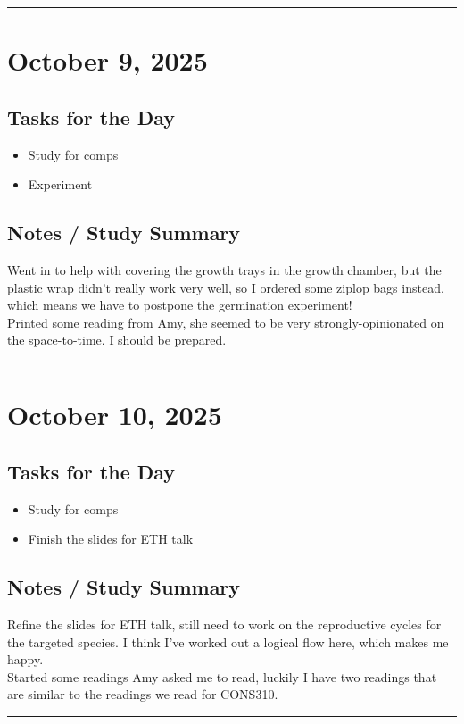 \documentclass[12pt]{article}
\begin{document}
\vspace{1em}
\hrule
\vspace{1em}

\section*{October 9, 2025}

\subsection*{Tasks for the Day}
\begin{itemize}
    \item Study for comps
    \item Experiment
\end{itemize}
\subsection*{Notes / Study Summary}
Went in to help with covering the growth trays in the growth chamber, but the plastic wrap didn't really work very well, so I ordered some ziplop bags instead, which means we have to postpone the germination experiment!\\
Printed some reading from Amy, she seemed to be very strongly-opinionated on the space-to-time. I should be prepared.
\vspace{1em}
\hrule
\vspace{1em}

\section*{October 10, 2025}

\subsection*{Tasks for the Day}
\begin{itemize}
    \item Study for comps
    \item Finish the slides for ETH talk
\end{itemize}
\subsection*{Notes / Study Summary}
Refine the slides for ETH talk, still need to work on the reproductive cycles for the targeted species. I think I've worked out a logical flow here, which makes me happy.\\
Started some readings Amy asked me to read, luckily I have two readings that are similar to the readings we read for CONS310.
\vspace{1em}
\hrule
\vspace{1em}
\end{document}
